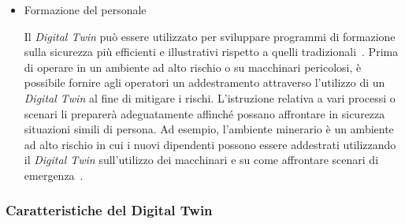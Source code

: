 \begin{itemize}
    \item Formazione del personale
    
    Il \emph{Digital Twin} può essere utilizzato per sviluppare programmi di formazione sulla sicurezza più efficienti e illustrativi rispetto a quelli tradizionali~\cite{Formazione}. Prima di operare in un ambiente ad alto rischio o su macchinari pericolosi, è possibile fornire agli operatori un addestramento attraverso l'utilizzo di un  \emph{Digital Twin} al fine di mitigare i rischi. L'istruzione relativa a vari processi o scenari li preparerà adeguatamente affinché possano affrontare in sicurezza situazioni simili di persona. Ad esempio, l'ambiente minerario è un ambiente ad alto rischio in cui i nuovi dipendenti possono essere addestrati utilizzando il \emph{Digital Twin} sull'utilizzo dei macchinari e su come affrontare scenari di emergenza~\cite{Mining}.
    
\end{itemize}

\newpage

\subsubsection{Caratteristiche del Digital Twin}

